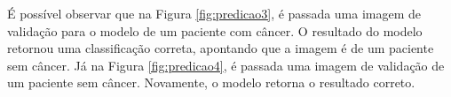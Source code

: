 



É possível observar que na Figura \ref{fig:predicao3}, é passada uma imagem de validação para o modelo de um paciente com câncer. O resultado do modelo retornou uma classificação correta, apontando que a imagem é de um paciente sem câncer. Já na Figura \ref{fig:predicao4}, é passada uma imagem de validação de um paciente sem câncer. Novamente, o modelo retorna o resultado correto.


